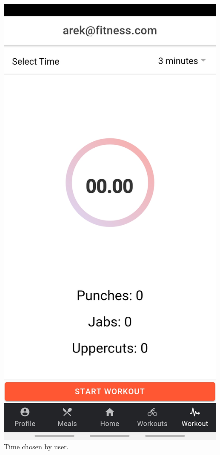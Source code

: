 \documentclass[a4paper,12pt]{report}
\begin{document}
\begin{figure}[ht]
\begin{minipage}[b]{0.5\linewidth}
    \includegraphics[width=.7\linewidth]{images/aplicationImages/3minutesSelected.jpeg} 
    \caption{Time chosen by user.} 
    \vspace{4ex}
  \end{minipage}%
  \begin{minipage}[b]{0.5\linewidth}
    \centering

\end{minipage}
\end{figure}
\end{document}
